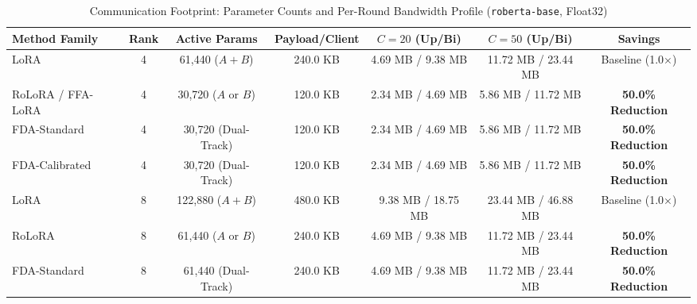 \documentclass[10pt,a4paper]{article}
\begin{document}
\begin{table}[H]
\centering
\caption{Communication Footprint: Parameter Counts and Per-Round Bandwidth Profile (\texttt{roberta-base}, Float32)}
\label{tab:comm_model}
\scriptsize
\setlength{\tabcolsep}{1.8pt}
\begin{tabular*}{\textwidth}{@{\extracolsep{\fill}}lcccccc@{}}
\toprule
\textbf{Method Family} & \textbf{Rank} & \textbf{Active Params} & \textbf{Payload/Client} & \textbf{$C=20$ (Up/Bi)} & \textbf{$C=50$ (Up/Bi)} & \textbf{Savings} \\
\midrule
LoRA & 4 & 61,440 ($A+B$) & 240.0 KB & 4.69 MB / 9.38 MB & 11.72 MB / 23.44 MB & Baseline (1.0$\times$) \\
RoLoRA / FFA-LoRA & 4 & 30,720 ($A$ or $B$) & 120.0 KB & 2.34 MB / 4.69 MB & 5.86 MB / 11.72 MB & \textbf{50.0\% Reduction} \\
FDA-Standard & 4 & 30,720 (Dual-Track) & 120.0 KB & 2.34 MB / 4.69 MB & 5.86 MB / 11.72 MB & \textbf{50.0\% Reduction} \\
FDA-Calibrated & 4 & 30,720 (Dual-Track) & 120.0 KB & 2.34 MB / 4.69 MB & 5.86 MB / 11.72 MB & \textbf{50.0\% Reduction} \\
\midrule
LoRA & 8 & 122,880 ($A+B$) & 480.0 KB & 9.38 MB / 18.75 MB & 23.44 MB / 46.88 MB & Baseline (1.0$\times$) \\
RoLoRA & 8 & 61,440 ($A$ or $B$) & 240.0 KB & 4.69 MB / 9.38 MB & 11.72 MB / 23.44 MB & \textbf{50.0\% Reduction} \\
FDA-Standard & 8 & 61,440 (Dual-Track) & 240.0 KB & 4.69 MB / 9.38 MB & 11.72 MB / 23.44 MB & \textbf{50.0\% Reduction} \\
\bottomrule
\end{tabular*}
\end{table}
\end{document}
